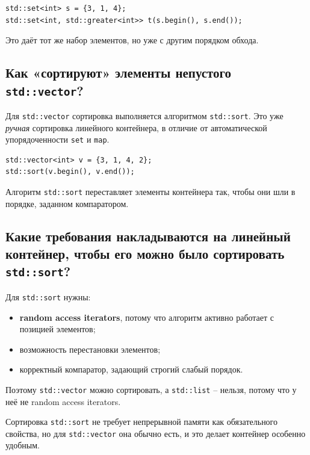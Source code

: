 \begin{example}
\begin{verbatim}
std::set<int> s = {3, 1, 4};
std::set<int, std::greater<int>> t(s.begin(), s.end());
\end{verbatim}
\end{example}

Это даёт тот же набор элементов, но уже с другим порядком обхода.

\subsection{Как «сортируют» элементы непустого \texttt{std::vector}?}
Для \texttt{std::vector} сортировка выполняется алгоритмом \texttt{std::sort}. Это уже \textit{ручная} сортировка линейного контейнера, в отличие от автоматической упорядоченности \texttt{set} и \texttt{map}.

\begin{example}
\begin{verbatim}
std::vector<int> v = {3, 1, 4, 2};
std::sort(v.begin(), v.end());
\end{verbatim}
\end{example}

Алгоритм \texttt{std::sort} переставляет элементы контейнера так, чтобы они шли в порядке, заданном компаратором.

\subsection{Какие требования накладываются на линейный контейнер, чтобы его можно было сортировать \texttt{std::sort}?}
Для \texttt{std::sort} нужны:
\begin{itemize}
    \item \textbf{random access iterators}, потому что алгоритм активно работает с позицией элементов;
    \item возможность перестановки элементов;
    \item корректный компаратор, задающий строгий слабый порядок.
\end{itemize}

Поэтому \texttt{std::vector} можно сортировать, а \texttt{std::list} -- нельзя, потому что у неё не random access iterators.

\begin{remark}
Сортировка \texttt{std::sort} не требует непрерывной памяти как обязательного свойства, но для \texttt{std::vector} она обычно есть, и это делает контейнер особенно удобным.
\end{remark}

